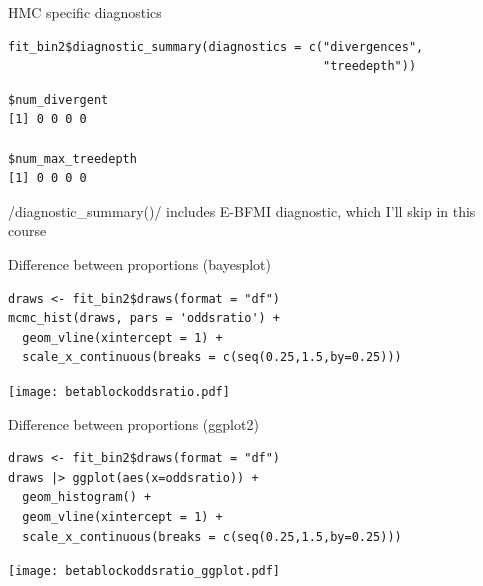 \documentclass[finnish,english,t]{beamer}
\begin{document}
\begin{frame}[fragile]{HMC specific diagnostics}
  
  {\small
\begin{verbatim}
fit_bin2$diagnostic_summary(diagnostics = c("divergences",
                                            "treedepth"))
\end{verbatim}
  }

  {\footnotesize
\begin{verbatim}
$num_divergent
[1] 0 0 0 0

$num_max_treedepth
[1] 0 0 0 0
\end{verbatim}
  }

  \pause
  
  \rinline/diagnostic_summary()/ includes E-BFMI diagnostic,
  which I'll skip in this course
  
\end{frame}

\begin{frame}[fragile]{Difference between proportions (bayesplot)}
  
  {\small
\begin{verbatim}
draws <- fit_bin2$draws(format = "df")
mcmc_hist(draws, pars = 'oddsratio') +
  geom_vline(xintercept = 1) +
  scale_x_continuous(breaks = c(seq(0.25,1.5,by=0.25)))
\end{verbatim}
  }

  \begin{center}
  \texttt{[image: betablockoddsratio.pdf]}
\end{center}
\end{frame}

\begin{frame}[fragile]{Difference between proportions (ggplot2)}

  \vspace{-0.5\baselineskip}
  {\small
\begin{verbatim}
draws <- fit_bin2$draws(format = "df")
draws |> ggplot(aes(x=oddsratio)) +
  geom_histogram() +
  geom_vline(xintercept = 1) +
  scale_x_continuous(breaks = c(seq(0.25,1.5,by=0.25)))
\end{verbatim}
  }

  \begin{center}
  \texttt{[image: betablockoddsratio\_ggplot.pdf]}
\end{center}
\end{frame}
\end{document}
